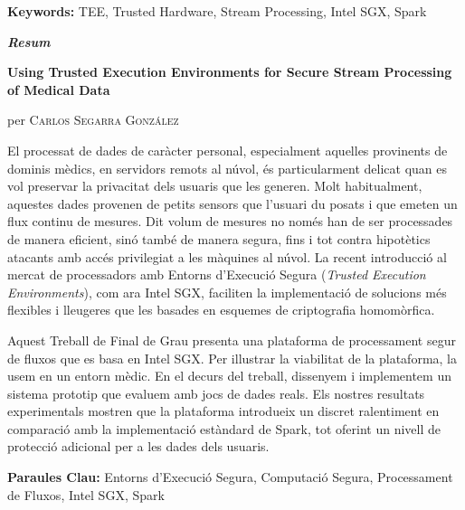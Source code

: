 \vspace{0.5cm}

\textbf{Keywords:} TEE, Trusted Hardware, Stream Processing, Intel SGX, Spark

\vfill
\pagebreak

\vspace*{2cm}
\begin{center}
%
%
%
%
%
%    
%
    \LARGE
    \textit{\textbf{Resum}} 

    \vspace{0.5cm}

    \large
    \textbf{Using Trusted Execution Environments for Secure Stream Processing of Medical Data}

    per \textsc{Carlos Segarra Gonz\'alez}
\end{center}

\vspace{0.5cm}

\normalsize

El processat de dades de car\`acter personal, especialment aquelles provinents de dominis m\`edics, en servidors remots al n\'uvol, \'es particularment delicat quan es vol preservar la privacitat dels usuaris que les generen.
Molt habitualment, aquestes dades provenen de petits sensors que l'usuari du posats i que emeten un flux continu de mesures.
Dit volum de mesures no nom\'es han de ser processades de manera eficient, sin\'o tamb\'e de manera segura, fins i tot contra hipot\`etics atacants amb acc\'es privilegiat a les m\`aquines al n\'uvol.
La recent introducci\'o al mercat de processadors amb Entorns d'Execuci\'o Segura (\textit{Trusted Execution Environments}), com ara Intel SGX, faciliten la implementaci\'o de solucions m\'es flexibles i lleugeres que les basades en esquemes de criptografia homom\`orfica.
    
Aquest Treball de Final de Grau presenta una plataforma de processament segur de fluxos que es basa en Intel SGX.
Per il{\tiny\raisebox{.9ex}{\textbullet}}lustrar la viabilitat de la plataforma, la usem en un entorn m\`edic.
En el decurs del treball, dissenyem i implementem un sistema prototip que evaluem amb jocs de dades reals.
Els nostres resultats experimentals mostren que la plataforma introdueix un discret ralentiment en comparaci\'o amb la implementaci\'o est\`andard de Spark, tot oferint un nivell de protecci\'o adicional per a les dades dels usuaris. 

\vspace{0.5cm}

\textbf{Paraules Clau:} Entorns d'Execuci\'o Segura, Computaci\'o Segura, Processament de Fluxos, Intel SGX, Spark

\vfill
